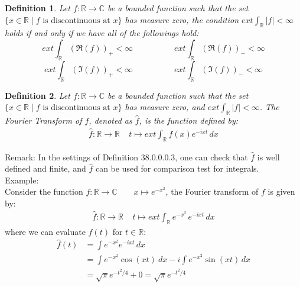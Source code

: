 \documentclass[15pt]{book}
\theoremstyle{break}
\theoremstyle{break}
\newtheorem{defn}{Definition}[corL]
\newcommand{\R}{\mathbb{R}}
\newcommand{\Complex}{\mathbb{C}}
\newcommand{\remark}{\color{blue}Remark: \color{black}}
\newcommand{\example}{\color{green}Example: \color{black}}
\begin{document}
\begin{defn}
Let $f:\R \to \Complex$ be a bounded function such that the set $\{x \in \R \mid f\text{ is discontinuous at }x\}$ has measure zero, the condition $ext \int_{\R}|f| < \infty$ holds if and only if we have all of the followings hold:
$$
ext\int_{\R}(\Re(f))_+ < \infty \quad\qquad\qquad ext\int_{\R}(\Re(f))_- < \infty
$$
$$
ext\int_{\R}(\Im(f))_+ < \infty\quad\qquad\qquad ext\int_{\R}(\Im(f))_- < \infty
$$
\end{defn}

\hfill\break
\begin{defn}
Let $f:\R \to \Complex$ be a bounded function such that the set $\{x \in \R \mid f\text{ is discontinuous at }x\}$ has measure zero, and $ext \int_{\R}|f| < \infty$. The Fourier Transform of $f$, denoted as $\hat{f}$, is the function defined by: 
\begin{align*}
\hat{f}:\R \to \R \ \ \ \ \ t\mapsto ext\int_{\R}f(x) e^{-i xt}\, dx
\end{align*}
\end{defn}

\remark In the settings of Definition 38.0.0.0.3, one can check that $\hat{f}$ is well defined and finite, and $\hat{f}$ can be used for comparison test for integrals.\\

\example\\
Consider the function $f:\R \to \Complex\qquad x\mapsto e^{-x^2}$, the Fourier transform of $f$ is given by:
\begin{align*}
\hat{f}:\R \to \R \ \ \ \ \ t\mapsto ext\int_{\R}e^{-x^2}\, e^{-i xt}\, dx
\end{align*}
where we can evaluate $\hat{f}(t)$ for $t \in \R$:
\begin{align*}
\hat{f}(t) 
&= \int e^{-x^2}e^{-ixt}\, dx \\
&= \int e^{-x^2}\cos(xt)\ dx  - i \int e^{-x^2} \sin(xt)\, dx \\
&= \sqrt{\pi} e^{-t^2/4} + 0 =\sqrt{\pi} e^{-t^2/4}
\end{align*}
\hfill\break
\end{document}
